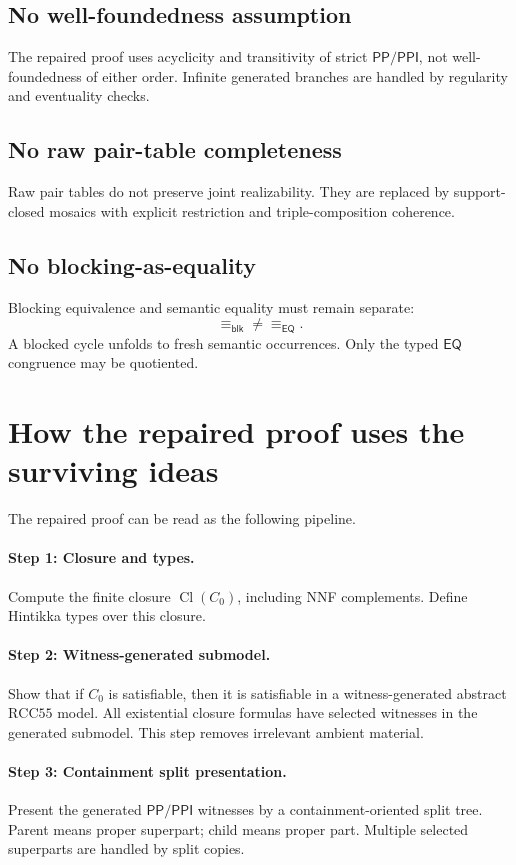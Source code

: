 \documentclass[11pt]{article}
\newcommand{\RCC}{\mathrm{RCC5}}
\newcommand{\PP}{\mathsf{PP}}
\newcommand{\PPI}{\mathsf{PPI}}
\newcommand{\EQ}{\mathsf{EQ}}
\newcommand{\Cl}{\operatorname{Cl}}
\newcommand{\blk}{\mathsf{blk}}
\newcommand{\eqrel}{\equiv_{\EQ}}
\newcommand{\blkrel}{\equiv_{\blk}}
\theoremstyle{definition}
\theoremstyle{plain}
\begin{document}
\subsection{No well-foundedness assumption}

The repaired proof uses acyclicity and transitivity of strict $\PP/\PPI$, not well-foundedness of either order.  Infinite generated branches are handled by regularity and eventuality checks.

\subsection{No raw pair-table completeness}

Raw pair tables do not preserve joint realizability.  They are replaced by support-closed mosaics with explicit restriction and triple-composition coherence.

\subsection{No blocking-as-equality}

Blocking equivalence and semantic equality must remain separate:
\[
\blkrel \ne \eqrel.
\]
A blocked cycle unfolds to fresh semantic occurrences.  Only the typed $\EQ$ congruence may be quotiented.

\section{How the repaired proof uses the surviving ideas}

The repaired proof can be read as the following pipeline.

\paragraph{Step 1: Closure and types.}
Compute the finite closure $\Cl(C_0)$, including NNF complements.  Define Hintikka types over this closure.

\paragraph{Step 2: Witness-generated submodel.}
Show that if $C_0$ is satisfiable, then it is satisfiable in a witness-generated abstract $\RCC5$ model.  All existential closure formulas have selected witnesses in the generated submodel.  This step removes irrelevant ambient material.

\paragraph{Step 3: Containment split presentation.}
Present the generated $\PP/\PPI$ witnesses by a containment-oriented split tree.  Parent means proper superpart; child means proper part.  Multiple selected superparts are handled by split copies.
\end{document}
